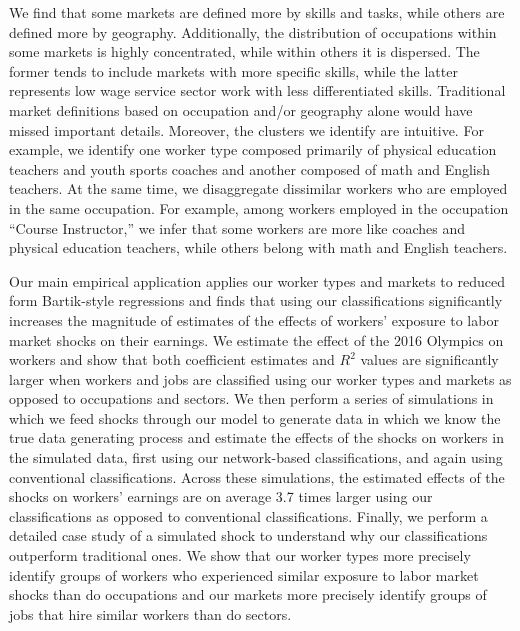 \documentclass[12pt]{article}
\theoremstyle{definition}
\theoremstyle{plain}
\begin{document}
We find that some markets are defined more by skills and tasks, while others are defined more by geography. Additionally, the distribution of occupations within some markets is highly concentrated, while within others it is dispersed. The former tends to include markets with more specific skills, while the latter represents low wage service sector work with less differentiated skills. Traditional market definitions based on occupation and/or geography alone would have missed important details. Moreover, the clusters we identify are intuitive. For example, we identify one worker type composed primarily of physical education teachers and youth sports coaches and another composed of math and English teachers. At the same time, we disaggregate dissimilar workers who are employed in the same occupation. For example, among workers employed in the occupation “Course Instructor,” we infer that some workers are more like coaches and physical education teachers, while others belong with math and English teachers.


Our main empirical application applies our worker types and markets to reduced form Bartik-style regressions and finds that using our classifications significantly increases the magnitude of estimates of the effects of workers' exposure to labor market shocks on their earnings. We estimate the effect of the 2016 Olympics on workers and show that both coefficient estimates and $R^2$ values are significantly larger when workers and jobs are classified using our worker types and markets as opposed to occupations and sectors. We then perform a series of simulations in which we feed shocks through our model to generate data in which we know the true data generating process and estimate the effects of the shocks on workers in the simulated data, first using our network-based classifications, and again using conventional classifications. Across these simulations, the estimated effects of the shocks on workers' earnings are on average 3.7 times larger using our classifications as opposed to conventional classifications. Finally, we perform a detailed case study of a simulated shock to understand why our classifications outperform traditional ones. We show that our worker types more precisely identify groups of workers who experienced similar exposure to labor market shocks than do occupations and our markets more precisely identify groups of jobs that hire similar workers than do sectors. 
\end{document}
